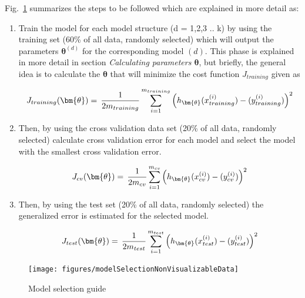 Fig.~\ref{fig:modelSelection} summarizes the steps to be followed which are explained in more detail as:

\begin{enumerate}
  \item Train the model for each model structure (d = 1,2,3 .. k) by using the training set (60\% of all data, randomly selected) which will output the parameters ${\bm{\theta}}^{(d)}$ for the corresponding model $(d)$.
  This phase is explained in more detail in section \emph{Calculating parameters ${\bm{\theta}}$}, but briefly, the general idea is to calculate the ${\bm{\theta}}$ that will minimize the cost function $J_{training}$ given as

\begin{equation}{\label{eqn:costFuncTraining}}
J_{training}({\bm{\theta}})
=\,
\frac{1}{2m_{training}} \sum\limits_{i=1}^{m_{training}} \Big(h_{\bm{\theta}}(x_{training}^{(i)}) - (y_{training}^{(i)})\Big)^2  
\end{equation}   
  
  \item Then, by using the cross validation data set (20\% of all data, randomly selected) calculate cross validation error for each model and select the model with the smallest cross validation error.

\begin{equation}{\label{eqn:costFuncCrossVal}}
J_{cv}({\bm{\theta}})
=\,
\frac{1}{2m_{cv}} \sum\limits_{i=1}^{m_{cv}} \Big(h_{\bm{\theta}}(x_{cv}^{(i)}) - (y_{cv}^{(i)})\Big)^2  
\end{equation} 

  \item Then, by using the test set (20\% of all data, randomly selected) the generalized error is estimated for the selected model.
  
\begin{equation}{\label{eqn:costFuncTest}}
J_{test}({\bm{\theta}})
=\,
\frac{1}{2m_{test}} \sum\limits_{i=1}^{m_{test}} \Big(h_{\bm{\theta}}(x_{test}^{(i)}) - (y_{test}^{(i)})\Big)^2  
\end{equation} 

\end{enumerate}

\begin{landscape}
\begin{figure}
\begin{center}
\texttt{[image: figures/modelSelectionNonVisualizableData]}    %
\caption{Model selection guide} 
\label{fig:modelSelection}
\end{center}
\end{figure}
\end{landscape}
 
